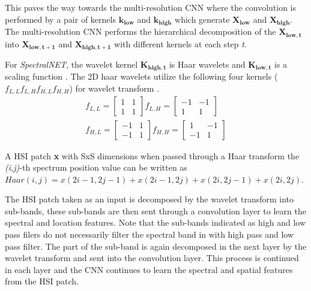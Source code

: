 \documentclass[journal]{IEEEtran}
\begin{document}

This paves the way towards the multi-resolution CNN where the convolution is performed by a pair of kernels $\mathbf{k_{low}}$ and $\mathbf{k_{high}}$ which generate $\mathbf{X_{low}}$ and $\mathbf{X_{high}}$. The multi-resolution CNN performs the hierarchical decomposition of the $\mathbf{X_{low,t}}$ into $\mathbf{X_{low,t+1}}$ and $\mathbf{X_{high,t+1}}$ with different kernels at each step \textit{t}. 

For \textit{SpectralNET}, the wavelet kernel $\mathbf{K_{high,t}}$ is Haar wavelets and $\mathbf{K_{low,t}}$ is a scaling function  \cite{wang2006moving}. The 2D haar wavelets utilize the following four kernels ($f_{L,L} f_{L,H} f_{H,L} f_{H,H}$) for wavelet transform \cite{liu2018multi}. 
\begin{equation}
\begin{split}
f_{L,L} =
\begin{bmatrix}
1&1\\1&1
\end{bmatrix}
f_{L,H} =
\begin{bmatrix}
-1&-1\\1&1
\end{bmatrix}
\\
f_{H,L} =
\begin{bmatrix}
-1&1\\-1&1
\end{bmatrix}
f_{H,H} =
\begin{bmatrix}
1&-1\\-1&1
\end{bmatrix}
\end{split}
\end{equation}

A HSI patch \textbf{x} with SxS dimensions when passed through a Haar transform the \textit{(i,j)}-th spectrum position value can be written as $Haar(\mathit{i,j}) = x(2i-1, 2j-1) + x(2i-1, 2j) + x(2i, 2j-1) + x(2i, 2j)$.
 

The HSI patch taken as an input is decomposed by the wavelet transform into sub-bands, these sub-bands are then sent through a convolution layer to learn the spectral and location features. Note that the sub-bands indicated as high and low pass filers do not necessarily filter the spectral band in with high pass and low pass filter. The part of the sub-band is again decomposed in the next layer by the wavelet transform and sent into the convolution layer. This process is continued in each layer and the CNN continues to learn the spectral and spatial features from the HSI patch.
\end{document}

